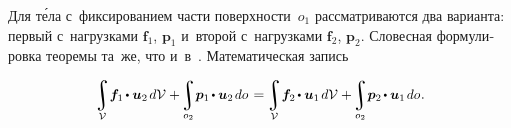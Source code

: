 \begin{otherlanguage}{russian}

Для т\'{е}ла с~фиксированием части поверхности~${o_1}$ рассматриваются два варианта: первый с~нагрузками $\bm{f}_1$, $\bm{p}_1$ и~второй с~нагрузками $\bm{f}_2$, $\bm{p}_2$.
Словесная формулировка теоремы та~же, что и~в~.
Математическая запись

\nopagebreak\vspace{1.3em}\begin{equation}\label{betti:reciprocalworktheorem}
\tikzmark{beginReciprocalFirstVariant} \scalebox{0.98}{$\displaystyle \integral\displaylimits_{\mathcal{V}} \hspace{-0.4ex} \bm{f}_1 \hspace{-0.2ex} \dotp \bm{u}_2 \hspace{.25ex} d\mathcal{V} $}
+ \hspace{-0.3ex}
\scalebox{0.96}{$\displaystyle\integral\displaylimits_{o_2} \hspace{-0.4ex} \bm{p}_1 \hspace{-0.2ex} \dotp \bm{u}_2 \hspace{.25ex} do $} \tikzmark{endReciprocalFirstVariant}
%
\hspace{.2ex} = \hspace{-0.2ex}
%
\tikzmark{beginReciprocalSecondVariant} \scalebox{0.98}{$\displaystyle \integral\displaylimits_{\mathcal{V}} \hspace{-0.4ex} \bm{f}_2 \hspace{-0.2ex} \dotp \bm{u}_1 \hspace{.25ex} d\mathcal{V} $}
+ \hspace{-0.3ex}
 \scalebox{0.96}{$\displaystyle\integral\displaylimits_{o_2} \hspace{-0.4ex} \bm{p}_2 \hspace{-0.2ex} \dotp \bm{u}_1 \hspace{.25ex} do $} \tikzmark{endReciprocalSecondVariant}
\hspace{.1ex} .
\end{equation}%
%


\end{otherlanguage}
